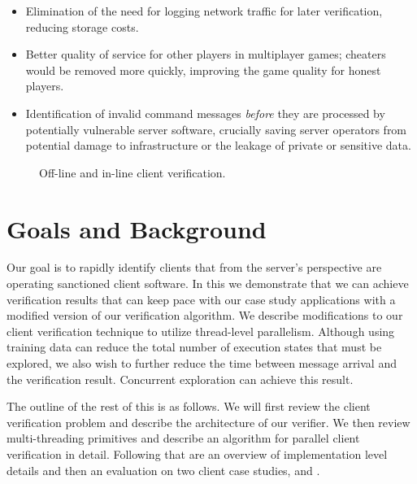 \begin{itemize}
  \item Elimination of the need for logging network traffic for later
    verification, reducing storage costs.
  \item Better quality of service for other players in multiplayer games;
    cheaters would be removed more quickly, improving the game
    quality for honest players.
  \item Identification of invalid command messages
    \emph{before} they are processed by potentially vulnerable server
    software, crucially saving server operators from potential damage to
    infrastructure or the leakage of private or sensitive data.
\end{itemize}

\begin{figure}[t]
\centering
{}
\caption{Off-line and in-line client verification.\label{fig:parallel:inline}}
\end{figure}

\section{Goals and Background}
Our goal is to rapidly identify clients that from the server's
perspective are operating sanctioned client software.
In this \paper we demonstrate that we can achieve
verification results that can keep pace with our case study
applications with a modified version of our verification algorithm. We
describe modifications to our client verification technique to utilize
thread-level parallelism. Although using training data can reduce the
total number of execution states that must be explored, we also wish
to further reduce the time between message arrival and the
verification result. Concurrent exploration can achieve this result.

The outline of the rest of this \paper is as follows.
We will first review the client verification problem and
describe the architecture of our verifier. We then review
multi-threading primitives and describe an algorithm for parallel
client verification in detail. Following that are an overview
of implementation level details and then an evaluation on two
client case studies, \tetrinet and \xpilot.


